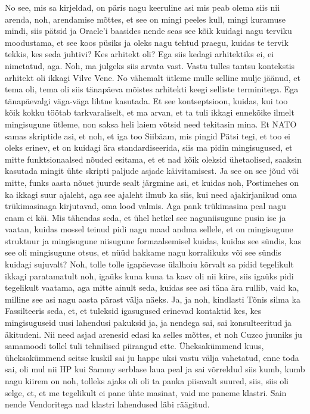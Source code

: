 No see, mis sa kirjeldad, on päris nagu keeruline asi mis peab olema siis nii arenda, noh, arendamise mõttes, et see on mingi peeles kull, mingi kuramuse mindi, siis pätsid ja Oracle'i baasides nende seas see kõik kuidagi nagu terviku moodustama, et see koos püsiks ja oleks nagu tehtud praegu, kuidas te tervik tekkis, kes seda juhtivi?
Kes arhitekt oli?
Ega siis kedagi arhitektiks ei, ei nimetatud, aga.
Noh, ma julgeks siis arvata vast.
Vastu tulles tantsu kontekstis arhitekt oli ikkagi Vilve Vene. No vähemalt ütleme mulle selline mulje jäänud, et tema oli, tema oli siis tänapäeva mõistes arhitekti keegi selliste terminitega.
Ega tänapäevalgi väga-väga lihtne kasutada.
Et see kontseptsioon, kuidas, kui too kõik kokku töötab tarkvaraliselt, et ma arvan, et ta tuli ikkagi ennekõike ilmelt mingisugune ütleme, non saksa heli laiem võtsid need tekitasin mina. Et NATO samas skriptide asi, et noh, et iga too Siibäam, mis pingid Pätsi tegi, et too ei oleks erinev, et on kuidagi ära standardiseerida, siis ma pidin mingisugused, et mitte funktsionaalsed nõuded esitama, et et nad kõik oleksid ühetaolised, saaksin kasutada mingit ühte skripti paljude asjade käivitamisest.
Ja see on see jõud või mitte, funks aasta nõuet juurde sealt järgmine asi, et kuidas noh, Postimehes on ka ikkagi suur ajaleht, aga see ajaleht ilmub ka siis, kui need ajakirjanikud oma trükimasinaga kirjutavad, oma lood valmis. Aga pank trükimasina peal nagu enam ei käi. Mis tähendas seda, et ühel hetkel see naguniisugune pusin ise ja vaatan, kuidas mossel teinud pidi nagu maad andma sellele, et on mingisugune struktuur ja mingisugune niisugune formaalsemisel kuidas, kuidas see sündis, kas see oli mingisugune otsus, et nüüd hakkame nagu korralikuks või see sündis kuidagi sujuvalt?
Noh, tolle tolle igapäevase ülalhoiu kõrvalt sa pidid tegelikult ikkagi paratamatult noh, igaüks kuna kuna ta kasv oli nii kiire, siis igaüks pidi tegelikult vaatama, aga mitte ainult seda, kuidas see asi täna ära rullib, vaid ka, milline see asi nagu aasta pärast välja näeks. Ja, ja noh, kindlasti Tõnis silma ka Fassilteeris seda, et, et tuleksid igasugused erinevad kontaktid kes, kes mingisuguseid uusi lahendusi pakuksid ja, ja nendega sai, sai konsulteeritud ja äkitudeni. Nii need asjad arenesid edasi ka selles mõttes, et noh Cuzco juuniks ju samamoodi tollel tuli tehnilised piirangud ette.
Üheksakümmend kuus, üheksakümmend seitse kuskil sai ju happe uksi vastu välja vahetatud, enne toda sai, oli mul nii HP kui Sammy serblase laua peal ja sai võrreldud siis kumb, kumb nagu kiirem on noh, tolleks ajaks oli oli ta panka piisavalt suured, siis, siis oli selge, et, et me tegelikult ei pane ühte masinat, vaid me paneme klastri. Sain nende Vendoritega nad klastri lahendused läbi räägitud.
